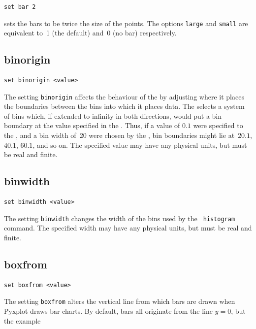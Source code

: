 \begin{verbatim}
set bar 2
\end{verbatim}

\noindent sets the bars to be twice the size of the points.  The options {\tt large} and
{\tt small} are equivalent to~1 (the default) and~0 (no bar) respectively.


\subsection{binorigin}

\begin{verbatim}
set binorigin <value>
\end{verbatim}

The setting {\tt binorigin} affects the behaviour of the  by
adjusting where it places the boundaries between the bins into which it places
data. The  selects a system of bins which, if extended to
infinity in both directions, would put a bin boundary at the value specified in
the . Thus, if a value of $0.1$ were specified to the
, and a bin width of~20 were chosen by the
, bin boundaries might lie at~$20.1$, $40.1$, $60.1$, and so
on. The specified value may have any physical units, but must be real and
finite.


\subsection{binwidth}

\begin{verbatim}
set binwidth <value>
\end{verbatim}

The setting {\tt binwidth} changes the width of the bins used by the {\tt
histogram} command. The specified width may have any physical units, but must
be real and finite.


\subsection{boxfrom}

\begin{verbatim}
set boxfrom <value>
\end{verbatim}

The setting {\tt boxfrom} alters the vertical line from which bars are drawn
when Pyxplot draws bar charts.  By default, bars all originate from the line
$y=0$, but the example

